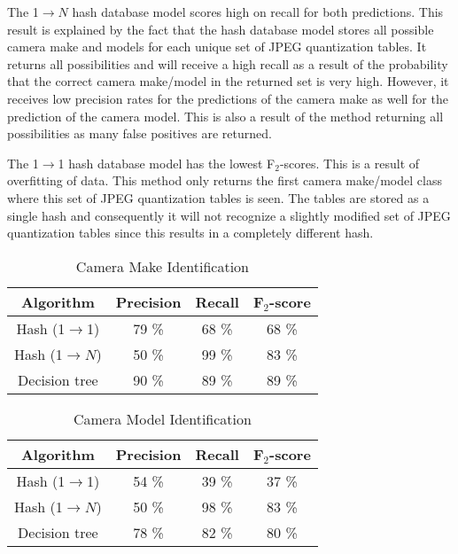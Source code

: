The 1$\rightarrow N$ hash database model scores high on recall for both predictions. This result is explained by the fact that the hash database model stores all possible camera make and models for each unique set of JPEG quantization tables. It returns all possibilities and will receive a high recall as a result of the probability that the correct camera make/model in the returned set is very high. However, it receives low precision rates for the predictions of the camera make as well for the prediction of the camera model. This is also a result of the method returning all possibilities as many false positives are returned.

The 1$\rightarrow$1 hash database model has the lowest F$_2$-scores. This is a result of overfitting of data. This method only returns the first camera make/model class where this set of JPEG quantization tables is seen. The tables are stored as a single hash and consequently it will not recognize a slightly modified set of JPEG quantization tables since this results in a completely different hash.

\begin{table}[h]
\begin{center}

\begin{tabular}{| c| c| c| c|}
\hline
\textbf{Algorithm} & \textbf{Precision} & \textbf{Recall} & \textbf{F$_2$-score}\\
\hline
Hash (1$\rightarrow$1) & 79 \% & 68 \% & 68 \%\\
Hash (1$\rightarrow N$) & 50 \% & 99 \% & 83 \%\\
Decision tree & 90 \% & 89 \% & 89 \% \\
\hline
\end{tabular}
\caption{Camera Make Identification}
\label{tab:fscore_make}
\end{center}

\end{table}

\begin{table}[h]
\begin{center}
\begin{tabular}{| c| c| c| c|}
\hline
\textbf{Algorithm} & \textbf{Precision} & \textbf{Recall} & \textbf{F$_2$-score}\\
\hline
Hash (1$\rightarrow$1) & 54 \% & 39 \% & 37 \%\\
Hash (1$\rightarrow N$) & 50 \% & 98 \% & 83 \%\\
Decision tree & 78 \% & 82 \% & 80 \% \\
\hline
\end{tabular}
\caption{Camera Model Identification}
\label{tab:fscore_model}
\end{center}

\end{table}


